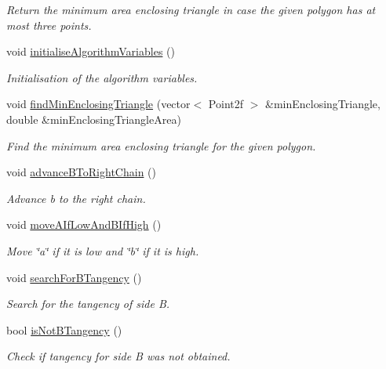 \begin{DoxyCompactItemize}
\begin{DoxyCompactList}\small\item\em Return the minimum area enclosing triangle in case the given polygon has at most three points. \end{DoxyCompactList}\item 
void \hyperlink{classmultiscale_1_1MinEnclosingTriangleFinder_ab41a0d36789e6dfb720325ce494b21f6}{initialise\-Algorithm\-Variables} ()
\begin{DoxyCompactList}\small\item\em Initialisation of the algorithm variables. \end{DoxyCompactList}\item 
void \hyperlink{classmultiscale_1_1MinEnclosingTriangleFinder_afe968e24fdc374841baa8fe21a6d8270}{find\-Min\-Enclosing\-Triangle} (vector$<$ Point2f $>$ \&min\-Enclosing\-Triangle, double \&min\-Enclosing\-Triangle\-Area)
\begin{DoxyCompactList}\small\item\em Find the minimum area enclosing triangle for the given polygon. \end{DoxyCompactList}\item 
void \hyperlink{classmultiscale_1_1MinEnclosingTriangleFinder_a55faab1deabea3b838490a4a3b62cafc}{advance\-B\-To\-Right\-Chain} ()
\begin{DoxyCompactList}\small\item\em Advance b to the right chain. \end{DoxyCompactList}\item 
void \hyperlink{classmultiscale_1_1MinEnclosingTriangleFinder_a88ca299e33ef6104513bd153501d5530}{move\-A\-If\-Low\-And\-B\-If\-High} ()
\begin{DoxyCompactList}\small\item\em Move \char`\"{}a\char`\"{} if it is low and \char`\"{}b\char`\"{} if it is high. \end{DoxyCompactList}\item 
void \hyperlink{classmultiscale_1_1MinEnclosingTriangleFinder_a7064b538e01622880b6a044e84d3ad0e}{search\-For\-B\-Tangency} ()
\begin{DoxyCompactList}\small\item\em Search for the tangency of side B. \end{DoxyCompactList}\item 
bool \hyperlink{classmultiscale_1_1MinEnclosingTriangleFinder_a9f071f42dbaff51c8975da1b77c1188e}{is\-Not\-B\-Tangency} ()
\begin{DoxyCompactList}\small\item\em Check if tangency for side B was not obtained. \end{DoxyCompactList}\item 

\end{DoxyCompactItemize}
